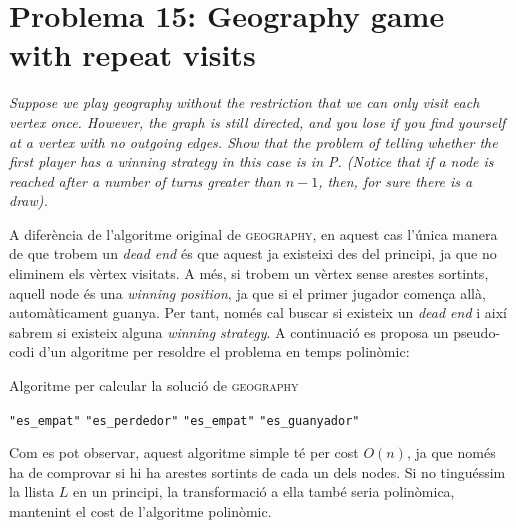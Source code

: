 \documentclass[a4paper]{article}
\begin{document}
\pagebreak
\section{Problema 15: Geography game with repeat visits}
\emph{Suppose we play geography without the restriction that we can only visit each vertex once. However, the graph is still directed, and you lose if you find yourself at a vertex with no outgoing edges. Show that the problem of telling whether the first player has a winning strategy in this case is in P. (Notice that if a node is reached after a number of turns greater than $n − 1$, then, for sure there is a draw).}

A diferència de l’algoritme original de \textsc{geography}, en aquest cas l'única manera de que trobem un \emph{dead end} és que aquest ja existeixi des del principi, ja que no eliminem els vèrtex visitats. A més, si  trobem un vèrtex sense arestes sortints, aquell node és una \emph{winning position}, ja que si el primer jugador comença allà, automàticament guanya. Per tant, només cal buscar si existeix un \emph{dead end} i així sabrem si existeix alguna \emph{winning strategy}. A continuació es proposa un pseudo-codi d'un algoritme per resoldre el problema en temps polinòmic:

\begin{algorithm}[H]
	\caption{Algoritme per calcular la solució de \textsc{geography}}
	\begin{algorithmic}[1]
				\State \Return \texttt{"es\_empat"}
				\State \Return \texttt{"es\_perdedor"}
				\State \Return \texttt{"es\_empat"}
			\Else
				\State \Return \texttt{"es\_guanyador"}
			\EndIf
		\EndFunction
	\end{algorithmic}
\end{algorithm}

Com es pot observar, aquest algoritme simple té per cost $O(n)$, ja que només ha de comprovar si hi ha arestes sortints de cada un dels nodes. Si no tinguéssim la llista $L$ en un principi, la transformació a ella també seria polinòmica, mantenint el cost de l’algoritme polinòmic.
\end{document}
